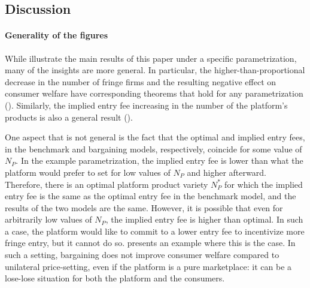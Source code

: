 \subsection{Discussion}
\label{sec:results_discussion}

\paragraph{Generality of the figures}
While  illustrate the main results of this paper under a specific parametrization, many of the insights are more general.
In particular, the higher-than-proportional decrease in the number of fringe firms and the resulting negative effect on consumer welfare have corresponding theorems that hold for any parametrization ().
Similarly, the implied entry fee increasing in the number of the platform's products is also a general result ().

One aspect that is not general is the fact that the optimal and implied entry fees, in the benchmark and bargaining models, respectively, coincide for some value of $N_P$.
In the example parametrization, the implied entry fee is lower than what the platform would prefer to set for low values of $N_P$ and higher afterward.
Therefore, there is an optimal platform product variety $N_P^*$ for which the implied entry fee is the same as the optimal entry fee in the benchmark model, and the results of the two models are the same.
However, it is possible that even for arbitrarily low values of $N_P$, the implied entry fee is higher than optimal.
In such a case, the platform would like to commit to a lower entry fee to incentivize more fringe entry, but it cannot do so.
 presents an example where this is the case.
In such a setting, bargaining does not improve consumer welfare compared to unilateral price-setting, even if the platform is a pure marketplace: it can be a lose-lose situation for both the platform and the consumers.


